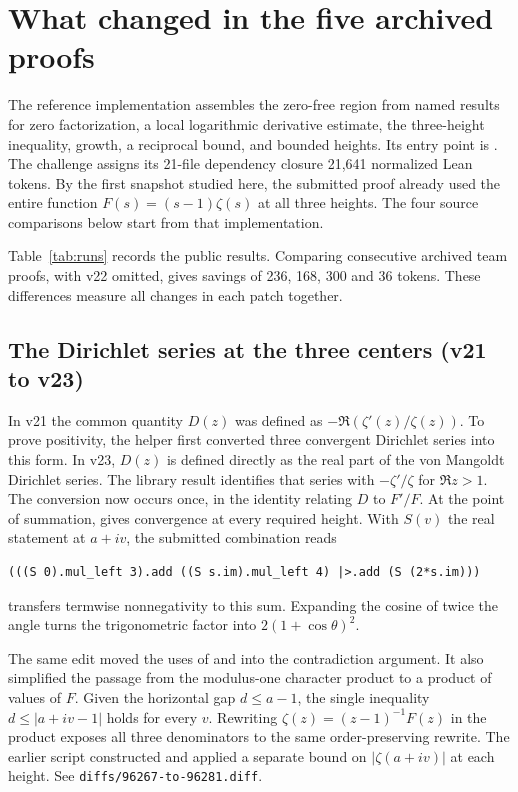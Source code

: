\section{What changed in the five archived proofs}
\label{sec:engineering}

The reference implementation assembles the zero-free region from named
results for zero factorization, a local logarithmic derivative estimate,
the three-height inequality, growth, a reciprocal bound, and bounded
heights. Its entry point is .
The challenge assigns its 21-file dependency closure 21,641 normalized
Lean tokens. By the first snapshot studied here, the submitted proof
already used the entire function \(F(s)=(s-1)\zeta(s)\) at all three
heights. The four source comparisons below start from that implementation.

Table~\ref{tab:runs} records the public results. Comparing consecutive
archived team proofs, with v22 omitted, gives savings of 236, 168, 300
and 36 tokens. These differences measure all changes in each patch together.

\subsection{The Dirichlet series at the three centers (v21 to v23)}

In v21 the common quantity \(D(z)\) was defined as
\(-\Re(\zeta'(z)/\zeta(z))\). To prove positivity, the helper
 first converted three convergent Dirichlet series into this
form. In v23, \(D(z)\) is defined directly as the real part of the
von Mangoldt Dirichlet series. The library result
identifies that series with \(-\zeta'/\zeta\) for \(\Re z>1\).
The conversion now occurs once, in the identity relating \(D\) to
\(F'/F\). At the point of summation,
 gives convergence at every required
height. With \(S(v)\) the real  statement at \(a+iv\),
the submitted combination reads
\begin{verbatim}
(((S 0).mul_left 3).add ((S s.im).mul_left 4) |>.add (S (2*s.im)))
\end{verbatim}
 transfers termwise nonnegativity to this sum.
Expanding the cosine of twice the angle turns the trigonometric factor
into \(2(1+\cos\theta)^2\).

The same edit moved the uses of  and 
into the contradiction argument. It also simplified the passage from
the modulus-one character product
 to a product of
values of \(F\). Given the horizontal gap \(d\leq a-1\), the single
inequality \(d\leq |a+iv-1|\) holds for every \(v\). Rewriting
\(\zeta(z)=(z-1)^{-1}F(z)\) in the product exposes all three
denominators to the same order-preserving rewrite. The earlier script
constructed and applied a separate bound on \(|\zeta(a+iv)|\) at each
height. See \texttt{diffs/96267-to-96281.diff}.

